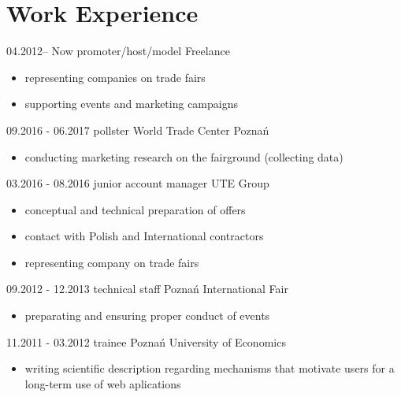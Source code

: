 \documentclass{arturmaciejaszek}
\begin{document}
\section{Work Experience}

    \begin{entrylist}
        \work
        {04.2012-- Now}
        {promoter/host/model}
        {Freelance}
        {
            \begin{itemize}
                \item representing companies on trade fairs
                \item supporting events and marketing campaigns
            \end{itemize}
        }
        \work
        {09.2016 - 06.2017}
        {pollster}
        {World Trade Center Poznań}
        {
            \begin{itemize}
                \item conducting marketing research on the fairground (collecting data)
            \end{itemize}
        }
        \work
        {03.2016 - 08.2016}
        {junior account manager}
        {UTE Group}
        {
            \begin{itemize}
                \item conceptual and technical preparation of offers
                \item contact with Polish and International contractors
                \item representing company on trade fairs
            \end{itemize}
        }
        \work
        {09.2012 - 12.2013}
        {technical staff}
        {Poznań International Fair}
        {
            \begin{itemize}
                \item preparating and ensuring proper conduct of events
            \end{itemize}
        }
        \work
        {11.2011 - 03.2012}
        {trainee}
        {Poznań University of Economics}
        {
            \begin{itemize}
                \item writing scientific description regarding mechanisms that motivate users for a long-term use of web aplications
            \end{itemize}
        }

    \end{entrylist}
\end{document}
